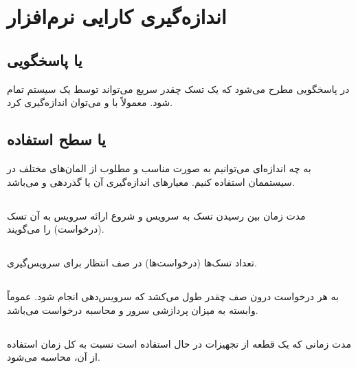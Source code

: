 \section{اندازه‌گیری کارایی نرم‌افزار}

\subsection{ یا پاسخگویی}

در پاسخگویی مطرح می‌شود که یک تسک چقدر سریع می‌تواند توسط یک سیستم تمام شود.
معمولاً با  و  می‌توان اندازه‌گیری کرد.

\subsection{ یا سطح استفاده}

به چه اندازه‌ای می‌توانیم به صورت مناسب و مطلوب از المان‌های مختلف در سیستممان
استفاده کنیم. معیار‌های اندازه‌گیری آن  یا گذردهی و
 می‌باشد.

\subsection{}

مدت زمان بین رسیدن تسک به سرویس و شروع ارائه سرویس به آن تسک (درخواست) را
می‌گویند.

\subsection{}

تعداد تسک‌ها (درخواست‌ها) در صف انتظار برای سرویس‌گیری.

\subsection{}

به هر درخواست درون صف چقدر طول می‌کشد که سرویس‌دهی انجام شود. عموماً وابسته به
میزان پردازشی سرور و محاسبه درخواست می‌باشد.

\subsection{}

مدت زمانی که یک قطعه از تجهیزات در حال استفاده است نسبت به کل زمان استفاده از
آن، محاسبه می‌شود.

